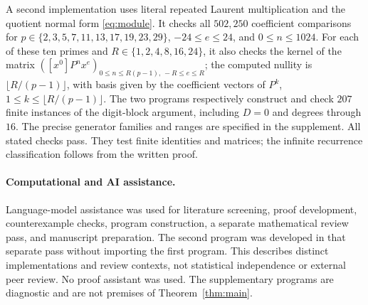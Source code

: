 \documentclass[11pt]{article}
\theoremstyle{remark}
\begin{document}
A second implementation uses literal repeated Laurent multiplication
and the quotient normal form \eqref{eq:module}. It checks all $502{,}250$
coefficient comparisons for
$p\in\{2,3,5,7,11,13,17,19,23,29\}$, $-24\leq e\leq24$,
and $0\leq n\leq1024$. For each of these ten primes and
$R\in\{1,2,4,8,16,24\}$, it also checks the kernel of the matrix
$([x^0]P^n x^e)_{0\leq n\leq R(p-1),\,-R\leq e\leq R}$;
the computed nullity is $\lfloor R/(p-1)\rfloor$, with basis given by the
coefficient vectors of $P^k$, $1\leq k\leq\lfloor R/(p-1)\rfloor$.
The two programs respectively construct and check $207$ finite instances
of the digit-block argument, including $D=0$ and degrees through $16$.
The precise generator families and ranges are specified in the supplement.
All stated checks pass. They test finite identities and matrices; the
infinite recurrence classification follows from the written proof.

\paragraph{Computational and AI assistance.}
Language-model assistance was used for literature screening, proof
development, counterexample checks, program construction, a separate
mathematical review pass, and manuscript preparation. The second program
was developed in that separate pass without importing the first program.
This describes distinct implementations and review contexts, not statistical
independence or external peer review. No proof assistant was used.
The supplementary programs are diagnostic and are not premises of
Theorem~\ref{thm:main}.



\end{document}

